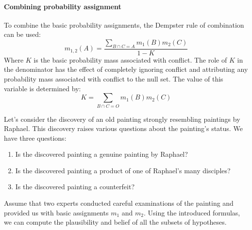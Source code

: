 \paragraph*{Combining probability assignment}
To combine the basic probability assignments, the Dempster rule of combination can be used:
\[m_{1,2}(A)=\dfrac{\sum_{B \cap C=A}m_1(B)m_2(C)}{1-K}\]
Where $K$ is the basic probability mass associated with conflict. 
The role of $K$ in the denominator has the effect of completely ignoring conflict and attributing any probability mass associated with conflict to the null set. 
The value of this variable is determined by:
\[K=\sum_{B \cap C=O}m_1(B)m_2(C)\]
\begin{example}
    Let's consider the discovery of an old painting strongly resembling paintings by Raphael. 
    This discovery raises various questions about the painting's status. 
    We have three questions:
    \begin{enumerate}
        \item Is the discovered painting a genuine painting by Raphael?
        \item Is the discovered painting a product of one of Raphael's many disciples?
        \item Is the discovered painting a counterfeit?
    \end{enumerate}
    Assume that two experts conducted careful examinations of the painting and provided us with basic assignments $m_1$ and $m_2$. 
    Using the introduced formulas, we can compute the plausibility and belief of all the subsets of hypotheses.
\end{example}